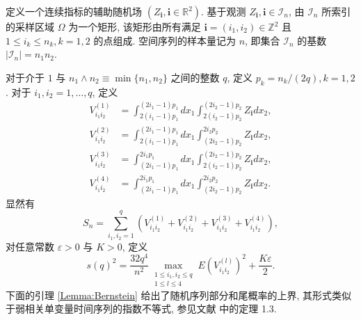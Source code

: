 \documentclass[a4paper,openay,14pt]{ctexbook}
\numberwithin{equation}{section}
\numberwithin{lem}{section}
\newtheorem{lemma}[theorem]{引理}%
\newtheorem{rema}[theorem]{注}%
\begin{document}




定义一个连续指标的辅助随机场 $(Z_{\mathbf{i}}, \mathbf{i}\in\mathbb{R}^2)$. 基于观测 ${Z_{\mathbf{i}}, \mathbf{i}\in\mathcal{I}_n}$, 由 $\mathcal{I}_n$ 所索引的采样区域 $\Omega$ 为一个矩形, 该矩形由所有满足 $\mathbf{i}=(i_1,i_2)\in\mathbb{Z}^2$ 且 $1\le i_k\le n_k, k=1,2$ 的点组成. 空间序列的样本量记为 $n$, 即集合 $\mathcal{I}_n$ 的基数 $|\mathcal{I}_n|=n_1 n_2$.

对于介于 $1$ 与 $n_1\wedge n_2\equiv \min\{n_1,n_2\}$ 之间的整数 $q$, 定义 $p_k=n_k/(2q), k=1,2$. 对于 $i_1,i_2=1,\ldots,q$, 定义
$$
\begin{aligned}
V_{i_1 i_2}^{(1)} & =\int_{2(i_1-1) p_1}^{(2 i_1-1) p_1} d x_1 \int_{2(i_2-1) p_2}^{(2 i_2-1) p_2} Z_\mathbf{i} d x_2, \\
V_{i_1 i_2}^{(2)} & =\int_{2(i_1-1) p_1}^{(2 i_1-1) p_1} d x_1 \int_{(2 i_2-1) p_2}^{2 i_2 p_2} Z_\mathbf{i} d x_2, \\
V_{i_1 i_2}^{(3)} & =\int_{(2 i_1-1) p_1}^{2 i_1 p_1} d x_1 \int_{2(i_2-1) p_2}^{(2 i_2-1) p_2} Z_\mathbf{i} d x_2, \\
V_{i_1 i_2}^{(4)} & =\int_{(2 i_1-1) p_1}^{2 i_1 p_1} d x_1 \int_{(2 i_2-1) p_2}^{2 i_2 p_2} Z_\mathbf{i} d x_2 .
\end{aligned}
$$
显然有
$$
S_n=\sum_{i_1, i_2=1}^q\left(V_{i_1 i_2}^{(1)}+V_{i_1 i_2}^{(2)}+V_{i_1 i_2}^{(3)}+V_{i_1 i_2}^{(4)}\right),
$$
对任意常数 $\varepsilon>0$ 与 $K>0$, 定义
$$
s(q)^2=\frac{32 q^4}{n^2} \max _{\substack{1 \leq i_1, i_2 \leq q \\ 1 \leq l \leq 4}} E\left(V_{i_1 i_2}^{(l)}\right)^2+\frac{K \varepsilon}{2}.
$$
下面的引理 \ref{Lemma:Bernstein} 给出了随机序列部分和尾概率的上界, 其形式类似于弱相关单变量时间序列的指数不等式, 参见文献\cite{bosq2012nonparametric} 中的定理 1.3.
\end{document}
